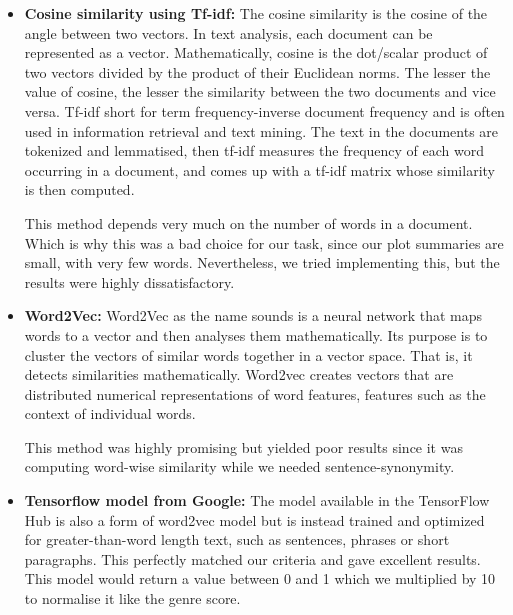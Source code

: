 \begin{itemize}
    \item \textbf{Cosine similarity using Tf-idf:} The cosine similarity is the cosine of the angle between two vectors. In text analysis, each document can be represented as a vector. Mathematically, cosine is the dot/scalar product of two vectors divided by the product of their Euclidean norms. The lesser the value of cosine, the lesser the similarity between the two documents and vice versa. Tf-idf short for term frequency-inverse document frequency and is often used in information retrieval and text mining. The text in the documents are tokenized and lemmatised, then  tf-idf measures the frequency of each word occurring in a document, and comes up with a tf-idf matrix whose similarity is then computed. 

    This method depends very much on the number of words in a document. Which is why this was a bad choice for our task, since our plot summaries are small, with very few words. Nevertheless, we tried implementing this, but the results were highly dissatisfactory. 

    \item \textbf{Word2Vec:} Word2Vec as the name sounds is a neural network that maps words to a vector and then analyses them mathematically. Its purpose is to cluster the vectors of similar words together in a vector space. That is, it detects similarities mathematically. Word2vec creates vectors that are distributed numerical representations of word features, features such as the context of individual words. 

    This method was highly promising but yielded poor results since it was computing word-wise similarity while we needed sentence-synonymity. 

    \item \textbf{Tensorflow model from Google: }The model\cite{TFHubModel} available in the TensorFlow Hub is also a form of word2vec model but is instead trained and optimized for greater-than-word length text, such as sentences, phrases or short paragraphs. This perfectly matched our criteria and gave excellent results. This model would return a value between 0 and 1 which we multiplied by 10 to normalise it like the genre score.

\end{itemize}
 
